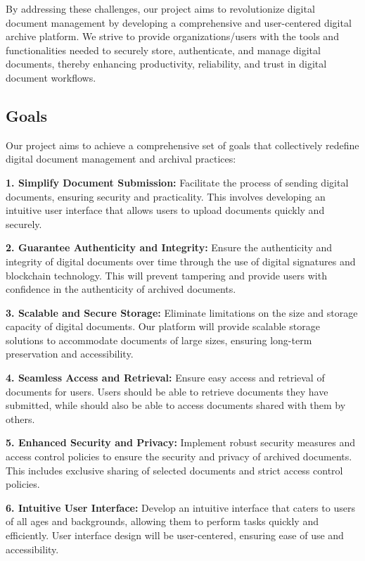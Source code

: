 \documentclass[a4paper,11pt]{article}
\begin{document}
        By addressing these challenges, our project aims to revolutionize digital document management by developing a comprehensive and user-centered digital archive platform. We strive to provide organizations/users with the tools and functionalities needed to securely store, authenticate, and manage digital documents, thereby enhancing productivity, reliability, and trust in digital document workflows.

    \vspace{0.5cm}
    \subsection{Goals}
        Our project aims to achieve a comprehensive set of goals that collectively redefine digital document management and archival practices:

        \textbf{1. Simplify Document Submission:}
        Facilitate the process of sending digital documents, ensuring security and practicality. This involves developing an intuitive user interface that allows users to upload documents quickly and securely.
        
        \textbf{2. Guarantee Authenticity and Integrity:}
        Ensure the authenticity and integrity of digital documents over time through the use of digital signatures and blockchain technology. This will prevent tampering and provide users with confidence in the authenticity of archived documents.
        
        \textbf{3. Scalable and Secure Storage:}
        Eliminate limitations on the size and storage capacity of digital documents. Our platform will provide scalable storage solutions to accommodate documents of large sizes, ensuring long-term preservation and accessibility.
        
        \textbf{4. Seamless Access and Retrieval:}
        Ensure easy access and retrieval of documents for users. Users should be able to retrieve documents they have submitted, while should also be able to access documents shared with them by others.
        
        \textbf{5. Enhanced Security and Privacy:}
        Implement robust security measures and access control policies to ensure the security and privacy of archived documents. This includes exclusive sharing of selected documents and strict access control policies.
        
        \textbf{6. Intuitive User Interface:}
        Develop an intuitive interface that caters to users of all ages and backgrounds, allowing them to perform tasks quickly and efficiently. User interface design will be user-centered, ensuring ease of use and accessibility.
        
\end{document}
